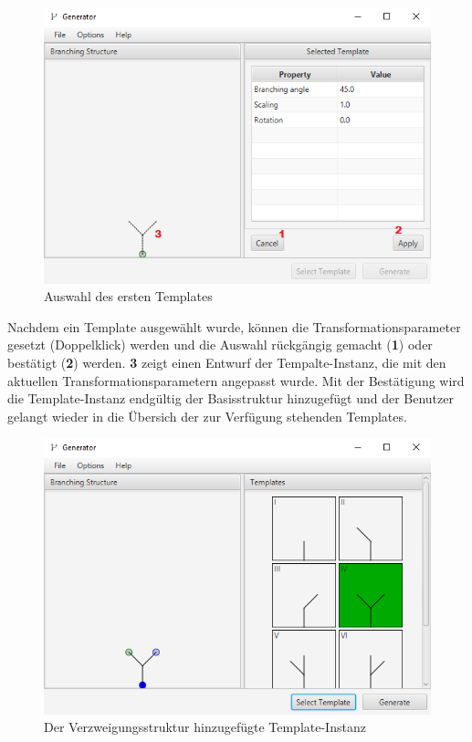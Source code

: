 \begin{figure}[H]
    \centering
    \includegraphics[width=12cm]{../images/UI_template.png}
    \caption{Auswahl des ersten Templates}
\end{figure}

Nachdem ein Template ausgewählt wurde, können die Transformationsparameter gesetzt (Doppelklick) werden und die Auswahl
rückgängig gemacht (\textbf{1}) oder bestätigt (\textbf{2}) werden.
\textbf{3} zeigt einen Entwurf der Tempalte-Instanz, die mit den aktuellen Transformationsparametern angepasst wurde.
Mit der Bestätigung wird die Template-Instanz endgültig der Basisstruktur hinzugefügt und der Benutzer gelangt wieder
in die Übersich der zur Verfügung stehenden Templates.
\begin{figure}[H]
    \centering
    \includegraphics[width=12cm]{../images/UI_applied.png}
    \caption{Der Verzweigungsstruktur hinzugefügte Template-Instanz}
\end{figure}


